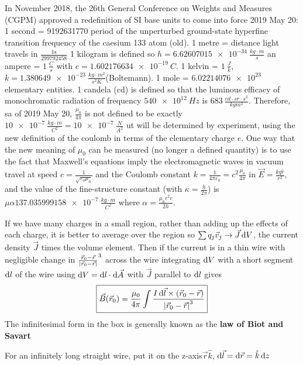 In November 2018, the 26th General Conference on Weights and Measures (CGPM) approved a redefinition of SI base units to come into force 2019 May 20:
1 second = 9192631770 period of the unperturbed ground-state hyperfine transition frequency of the caesium 133 atom (old).
 1 metre = distance light travels in $\frac{1 \text{s}}{299792458}$ 1 kilogram is defined so $h =\SI{6.62607015e-34}{\frac{kg \cdot m}{s}}$ an ampere = $\SI{1}{\frac{C}{s}}$ with $e = \SI{1.602176634e-19}{C}$.
1 kelvin = $\SI{1}{\frac{J}{k}}$, $k = \SI{1.380649e-23}{\frac{kg \cdot m^2}{s^2 K}}$(Boltemann). 
1 mole = $\SI{6.02214076e23}{}$ elementary entities. 
1 candela (cd) is defined so that the luminous efficacy of monochromatic radiation of frequency $\SI{540e12}{Hz}$ is $\SI{683}{\frac{cd \cdot sr \cdot s^3}{kg m^3}}$.
Therefore, sa of 2019 May 20, $\frac{\mu_0}{4\pi}$ is not defined to be exactly $\SI{10e-7}{\frac{kg \cdot m}{C^2}} = \SI{10e-7}{\frac{N}{A^2}}$ ut will be determined by experiment, using the new definition of the coulomb in terms of the elementary charge $e$.
One way that the new meaning of $\mu_0$ can be measured (no longer a defined quantity) is to use the fact that Maxwell's equations imply the electromagnetic waves in vacuum travel at speed $c= \frac{1}{\sqrt{\varepsilon_0\mu_0}}$ and the Coulomb constant $k = \frac{1}{4 \pi \varepsilon_0} = c^2 \frac{\mu_0}{4\pi}$ in $\vec{E} = \frac{kq \hat{r}}{r^2}$, and the value of the fine-structure constant (with $\kappa = \frac{h}{2 \pi}$) is $\mu \alpha \SI{137.035999158e-7}{\frac{kg \cdot m}{C^2}}$ where $\alpha = \frac{\mu_0e^2c}{2h}$.

If we have many charges in a small region, rather than adding up the effects of each charge, it is better to average over the region so $\sum q_j \vec{v}_j \rightarrow \vec{J} \operatorname{d\!} V$, the current density $\vec{J}$ times the volume element. Then if the current is in a thin wire with negligible change in $\frac{\vec{r}_0 - \vec{r}}{\left| \vec{r}_0 - \vec{r} \right|}^3$ across the wire integrating $\operatorname{d\!} V$ with a short segment $\operatorname{d\!} l$ of the wire using $\operatorname{d\!} V = \operatorname{d\!} l \cdot \operatorname{d\!} \vec{A}$ with $\vec{J}$ parallel to $\operatorname{d\!} l$ gives
\begin{equation}
\boxed{\vec{B}(\vec{r}_0) = \frac{\mu_0}{4 \pi} \int \frac{I \operatorname{d\!} \vec{l} \times (\vec{r}_0 - \vec{r})}{\left| \vec{r}_0 - \vec{r} \right|^3}}
\end{equation}
The infinitesimal form in the box is generally known as the \textbf{law of Biot and Savart}

For an infinitely long straight wire, put it on the z-axis$\vec{r}\hat{k}$, $\operatorname{d\!} \vec{l}= \operatorname{d\!} \vec{r} = \hat{k} \operatorname{d\!} z$